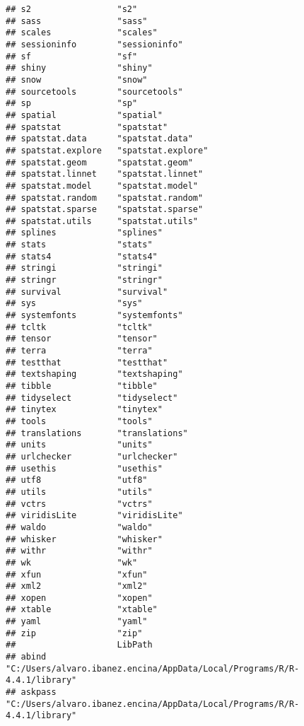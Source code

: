 \documentclass[
]{article}
\begin{document}
\begin{verbatim}
## s2                 "s2"                
## sass               "sass"              
## scales             "scales"            
## sessioninfo        "sessioninfo"       
## sf                 "sf"                
## shiny              "shiny"             
## snow               "snow"              
## sourcetools        "sourcetools"       
## sp                 "sp"                
## spatial            "spatial"           
## spatstat           "spatstat"          
## spatstat.data      "spatstat.data"     
## spatstat.explore   "spatstat.explore"  
## spatstat.geom      "spatstat.geom"     
## spatstat.linnet    "spatstat.linnet"   
## spatstat.model     "spatstat.model"    
## spatstat.random    "spatstat.random"   
## spatstat.sparse    "spatstat.sparse"   
## spatstat.utils     "spatstat.utils"    
## splines            "splines"           
## stats              "stats"             
## stats4             "stats4"            
## stringi            "stringi"           
## stringr            "stringr"           
## survival           "survival"          
## sys                "sys"               
## systemfonts        "systemfonts"       
## tcltk              "tcltk"             
## tensor             "tensor"            
## terra              "terra"             
## testthat           "testthat"          
## textshaping        "textshaping"       
## tibble             "tibble"            
## tidyselect         "tidyselect"        
## tinytex            "tinytex"           
## tools              "tools"             
## translations       "translations"      
## units              "units"             
## urlchecker         "urlchecker"        
## usethis            "usethis"           
## utf8               "utf8"              
## utils              "utils"             
## vctrs              "vctrs"             
## viridisLite        "viridisLite"       
## waldo              "waldo"             
## whisker            "whisker"           
## withr              "withr"             
## wk                 "wk"                
## xfun               "xfun"              
## xml2               "xml2"              
## xopen              "xopen"             
## xtable             "xtable"            
## yaml               "yaml"              
## zip                "zip"               
##                    LibPath                                                                 
## abind              "C:/Users/alvaro.ibanez.encina/AppData/Local/Programs/R/R-4.4.1/library"
## askpass            "C:/Users/alvaro.ibanez.encina/AppData/Local/Programs/R/R-4.4.1/library"

\end{verbatim}
\end{document}
